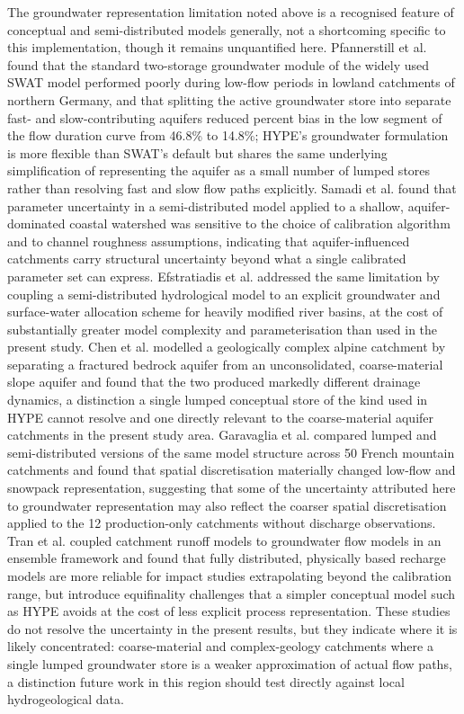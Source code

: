 \documentclass[draft]{agujournal2019}
\begin{document}
The groundwater representation limitation noted above is a recognised feature of conceptual and semi-distributed models generally, not a shortcoming specific to this implementation, though it remains unquantified here. Pfannerstill et al.  found that the standard two-storage groundwater module of the widely used SWAT model performed poorly during low-flow periods in lowland catchments of northern Germany, and that splitting the active groundwater store into separate fast- and slow-contributing aquifers reduced percent bias in the low segment of the flow duration curve from 46.8\% to 14.8\%; HYPE's groundwater formulation is more flexible than SWAT's default but shares the same underlying simplification of representing the aquifer as a small number of lumped stores rather than resolving fast and slow flow paths explicitly. Samadi et al.  found that parameter uncertainty in a semi-distributed model applied to a shallow, aquifer-dominated coastal watershed was sensitive to the choice of calibration algorithm and to channel roughness assumptions, indicating that aquifer-influenced catchments carry structural uncertainty beyond what a single calibrated parameter set can express. Efstratiadis et al.  addressed the same limitation by coupling a semi-distributed hydrological model to an explicit groundwater and surface-water allocation scheme for heavily modified river basins, at the cost of substantially greater model complexity and parameterisation than used in the present study. Chen et al.  modelled a geologically complex alpine catchment by separating a fractured bedrock aquifer from an unconsolidated, coarse-material slope aquifer and found that the two produced markedly different drainage dynamics, a distinction a single lumped conceptual store of the kind used in HYPE cannot resolve and one directly relevant to the coarse-material aquifer catchments in the present study area. Garavaglia et al.  compared lumped and semi-distributed versions of the same model structure across 50 French mountain catchments and found that spatial discretisation materially changed low-flow and snowpack representation, suggesting that some of the uncertainty attributed here to groundwater representation may also reflect the coarser spatial discretisation applied to the 12 production-only catchments without discharge observations. Tran et al.  coupled catchment runoff models to groundwater flow models in an ensemble framework and found that fully distributed, physically based recharge models are more reliable for impact studies extrapolating beyond the calibration range, but introduce equifinality challenges that a simpler conceptual model such as HYPE avoids at the cost of less explicit process representation. These studies do not resolve the uncertainty in the present results, but they indicate where it is likely concentrated: coarse-material and complex-geology catchments where a single lumped groundwater store is a weaker approximation of actual flow paths, a distinction future work in this region should test directly against local hydrogeological data.
\end{document}
